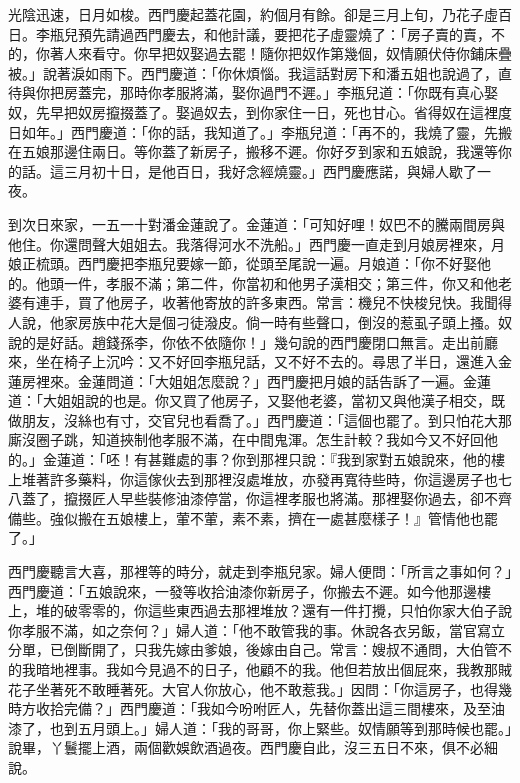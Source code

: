 光陰迅速，日月如梭。西門慶起蓋花園，約個月有餘。卻是三月上旬，乃花子虛百日。李瓶兒預先請過西門慶去，和他計議，要把花子虛靈燒了：「房子賣的賣，不的，你著人來看守。你早把奴娶過去罷！隨你把奴作第幾個，奴情願伏侍你鋪床疊被。」說著淚如雨下。西門慶道：「你休煩惱。我這話對房下和潘五姐也說過了，直待與你把房蓋完，那時你孝服將滿，娶你過門不遲。」李瓶兒道：「你既有真心娶奴，先早把奴房攛掇蓋了。娶過奴去，到你家住一日，死也甘心。省得奴在這裡度日如年。」西門慶道：「你的話，我知道了。」李瓶兒道：「再不的，我燒了靈，先搬在五娘那邊住兩日。等你蓋了新房子，搬移不遲。你好歹到家和五娘說，我還等你的話。這三月初十日，是他百日，我好念經燒靈。」西門慶應諾，與婦人歇了一夜。

到次日來家，一五一十對潘金蓮說了。金蓮道：「可知好哩！奴巴不的騰兩間房與他住。你還問聲大姐姐去。我落得河水不洗船。」西門慶一直走到月娘房裡來，月娘正梳頭。西門慶把李瓶兒要嫁一節，從頭至尾說一遍。月娘道：「你不好娶他的。他頭一件，孝服不滿；第二件，你當初和他男子漢相交；第三件，你又和他老婆有連手，買了他房子，收著他寄放的許多東西。常言：機兒不快梭兒快。我聞得人說，他家房族中花大是個刁徒潑皮。倘一時有些聲口，倒沒的惹虱子頭上搔。奴說的是好話。趙錢孫李，你依不依隨你！」幾句說的西門慶閉口無言。走出前廳來，坐在椅子上沉吟：又不好回李瓶兒話，又不好不去的。尋思了半日，還進入金蓮房裡來。金蓮問道：「大姐姐怎麼說？」西門慶把月娘的話告訴了一遍。金蓮道：「大姐姐說的也是。你又買了他房子，又娶他老婆，當初又與他漢子相交，既做朋友，沒絲也有寸，交官兒也看喬了。」西門慶道：「這個也罷了。到只怕花大那廝沒圈子跳，知道挾制他孝服不滿，在中間鬼渾。怎生計較？我如今又不好回他的。」金蓮道：「呸！有甚難處的事？你到那裡只說：『我到家對五娘說來，他的樓上堆著許多藥料，你這傢伙去到那裡沒處堆放，亦發再寬待些時，你這邊房子也七八蓋了，攛掇匠人早些裝修油漆停當，你這裡孝服也將滿。那裡娶你過去，卻不齊備些。強似搬在五娘樓上，葷不葷，素不素，擠在一處甚麼樣子！』管情他也罷了。」

西門慶聽言大喜，那裡等的時分，就走到李瓶兒家。婦人便問：「所言之事如何？」西門慶道：「五娘說來，一發等收拾油漆你新房子，你搬去不遲。如今他那邊樓上，堆的破零零的，你這些東西過去那裡堆放？還有一件打攪，只怕你家大伯子說你孝服不滿，如之奈何？」婦人道：「他不敢管我的事。休說各衣另飯，當官寫立分單，已倒斷開了，只我先嫁由爹娘，後嫁由自己。常言：嫂叔不通問，大伯管不的我暗地裡事。我如今見過不的日子，他顧不的我。他但若放出個屁來，我教那賊花子坐著死不敢睡著死。大官人你放心，他不敢惹我。」因問：「你這房子，也得幾時方收拾完備？」西門慶道：「我如今吩咐匠人，先替你蓋出這三間樓來，及至油漆了，也到五月頭上。」婦人道：「我的哥哥，你上緊些。奴情願等到那時候也罷。」說畢，丫鬟擺上酒，兩個歡娛飲酒過夜。西門慶自此，沒三五日不來，俱不必細說。

